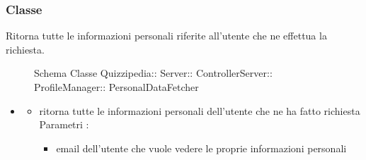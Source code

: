 \subsubsection{Classe }
Ritorna tutte le informazioni personali riferite all'utente che ne effettua la richiesta.
\begin{figure}[H]
\centering
\noindent{}
\caption[Schema Classe PersonalDataFetcher]{Schema Classe Quizzipedia:: Server:: ControllerServer:: ProfileManager:: PersonalDataFetcher}
\end{figure}
\begin{itemize}
\item {}
\begin{itemize}
\item {}
\newline
ritorna tutte le informazioni personali dell'utente che ne ha fatto richiesta
\newline
Parametri :
\begin{itemize}
\item {}
\newline
email dell'utente che vuole vedere le proprie informazioni personali
\end{itemize}
\end{itemize}
\end{itemize}

